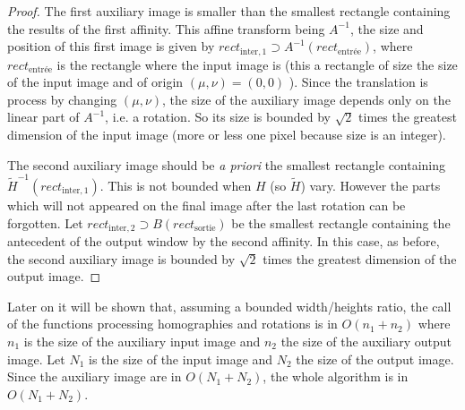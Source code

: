  \begin{proof}
  The first auxiliary image is smaller than the smallest rectangle containing the results of the first affinity. This affine transform being $A^{-1}$, the size and position of this first image is given by $rect_{\text{inter},1} \supset A^{-1}(rect_\text{entrée})$, where $rect_\text{entrée}$ is the rectangle where the input image is (this a rectangle of size the size of the input image and of origin $(\mu,\nu)=(0,0)$ ). Since the translation is process by changing $(\mu,\nu)$, the size of the auxiliary image depends only on the linear part of $A^{-1}$, i.e. a rotation. So its size is bounded by $\sqrt{2}$ times the greatest dimension of the input image (more or less one pixel because size is an integer).
  
  The second auxiliary image should be \emph{a priori} the smallest rectangle containing $\tilde H^{-1}(rect_{\text{inter},1})$. This is not bounded when $H$ (so $\tilde H$) vary. However the parts which will not appeared on the final image after the last rotation can be forgotten. Let $rect_{\text{inter},2} \supset B(rect_{\text{sortie}})$ be the smallest rectangle containing the antecedent of the output window by the second affinity. In this case, as before, the second auxiliary image is bounded by $\sqrt{2}$ times the greatest dimension of the output image.
   \end{proof}
 
 Later on it will be shown that, assuming a bounded width/heights ratio, the call of the functions processing homographies and rotations is in $O(n_1+n_2)$ where $n_1$ is the size of the auxiliary input image and $n_2$ the size of the auxiliary output image. Let $N_1$ is the size of the input image and $N_2$ the size of the output image. Since the auxiliary image are in $O(N_1+N_2)$, the whole algorithm is in $O(N_1+N_2)$.
 
 
